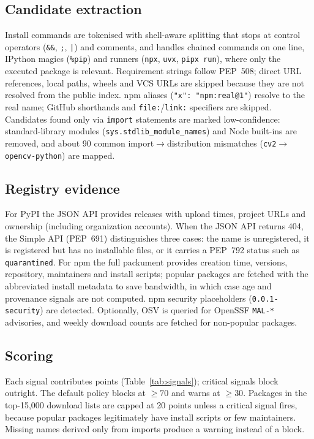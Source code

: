 \documentclass[11pt,a4paper]{article}
\begin{document}
\subsection{Candidate extraction}
Install commands are tokenised with shell-aware splitting that stops at control operators
(\texttt{\&\&}, \texttt{;}, \texttt{|}) and comments, and handles chained commands on one line, IPython
magics (\texttt{\%pip}) and runners (\texttt{npx}, \texttt{uvx}, \texttt{pipx run}), where only the
executed package is relevant. Requirement strings follow PEP~508; direct URL references, local paths,
wheels and VCS URLs are skipped because they are not resolved from the public index. npm aliases
(\texttt{"x": "npm:real@1"}) resolve to the real name; GitHub shorthands and \texttt{file:}/\texttt{link:}
specifiers are skipped. Candidates found only via \texttt{import} statements are marked low-confidence:
standard-library modules (\texttt{sys.stdlib\_module\_names}) and Node built-ins are removed, and about 90
common import$\to$distribution mismatches (\texttt{cv2}$\to$\texttt{opencv-python}) are mapped.

\subsection{Registry evidence}
For PyPI the JSON API provides releases with upload times, project URLs and ownership (including
organization accounts). When the JSON API returns 404, the Simple API (PEP~691) distinguishes three cases:
the name is unregistered, it is registered but has no installable files, or it carries a PEP~792 status
such as \texttt{quarantined}. For npm the full packument provides creation time, versions, repository,
maintainers and install scripts; popular packages are fetched with the abbreviated install metadata to save
bandwidth, in which case age and provenance signals are not computed. npm security placeholders
(\texttt{0.0.1-security}) are detected. Optionally, OSV is queried for OpenSSF \texttt{MAL-*} advisories,
and weekly download counts are fetched for non-popular packages.

\subsection{Scoring}
Each signal contributes points (Table~\ref{tab:signals}); critical signals block outright. The default
policy blocks at $\geq 70$ and warns at $\geq 30$. Packages in the top-15{,}000 download lists are capped
at 20 points unless a critical signal fires, because popular packages legitimately have install scripts or
few maintainers. Missing names derived only from imports produce a warning instead of a block.
\end{document}
